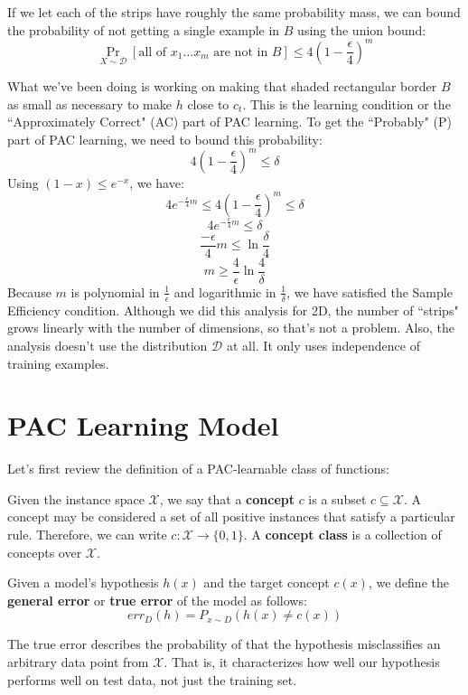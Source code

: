 \documentclass{article}
\begin{document}
If we let each of the strips have roughly the same probability mass, we can bound the probability of not getting a single example in $B$ using the union bound:
\[\Pr_{X \sim \mathcal{D}}[\text{all of } x_1 \dots x_m \text{ are not in } B] \leq 4 \left(1 - \frac{\epsilon}{4}\right)^m\]

What we've been doing is working on making that shaded rectangular border $B$ as small as necessary to make $h$ close to $c_t$. This is the learning condition or the ``Approximately Correct" (AC) part of PAC learning. To get the ``Probably" (P) part of PAC learning, we need to bound this probability:
\[4 \left(1 - \frac{\epsilon}{4}\right)^m \leq \delta\]
Using $(1 - x) \leq e^{-x}$, we have:
\[4e^{-\frac{\epsilon}{4} m} \leq 4 \left(1 - \frac{\epsilon}{4}\right)^m \leq \delta\]
\[4e^{-\frac{\epsilon}{4} m} \leq \delta\]
\[\frac{-\epsilon}{4} m \leq \ln \frac{\delta}{4}\]
\[m \geq \frac{4}{\epsilon} \ln \frac{4}{\delta}\]
Because $m$ is polynomial in $\frac{1}{\epsilon}$ and logarithmic in $\frac{1}{\delta}$, we have satisfied the Sample Efficiency condition. Although we did this analysis for 2D, the number of ``strips" grows linearly with the number of dimensions, so that's not a problem. Also, the analysis doesn't use the distribution $\mathcal{D}$ at all. It only uses independence of training examples.

\section{PAC Learning Model}
Let's first review the definition of a PAC-learnable class of functions:

Given the instance space $\mathcal{X}$, we say that a \textbf{concept}
$c$ is a subset $c \subseteq \mathcal{X}$. A concept may be considered a
set of all positive instances that satisfy a particular rule. Therefore,
we can write $c : \mathcal{X} \rightarrow \{0, 1\}$. A
\textbf{concept class} is a collection of concepts over $\mathcal{X}$.

Given a model's hypothesis $h(x)$ and the target concept $c(x)$, we
define the \textbf{general error} or \textbf{true error} of the model as
follows:
$$err_D(h) = P_{x\sim D}(h(x) \neq c(x))$$

The true error describes the probability of that the hypothesis
misclassifies an arbitrary data point from $\mathcal{X}$. That is, it
characterizes how well our hypothesis performs well on test data, not
just the training set.
\end{document}
